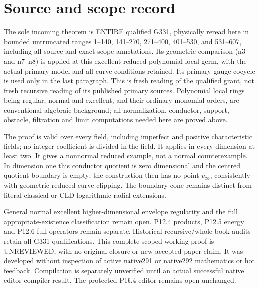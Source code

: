 \documentclass[11pt]{article}
\begin{document}
\section{Source and scope record}

The sole incoming theorem is ENTIRE qualified G331, physically reread
here in bounded untruncated ranges 1--140, 141--270, 271--400, 401--530,
and 531--607, including all source and exact-scope annotations.
Its geometric comparison (n3 and n7--n8) is applied at this excellent
reduced polynomial local germ, with the actual primary-model and all-curve
conditions retained. Its primary-gauge cocycle is used only in the last
paragraph. This is fresh reading of the qualified grant, not fresh
recursive reading of its published primary sources.
Polynomial local rings being regular, normal and excellent, and their
ordinary monomial orders, are conventional algebraic background;
all normalization, conductor, support, obstacle, filtration and limit
computations needed here are proved above.

The proof is valid over every field, including imperfect and positive
characteristic fields; no integer coefficient is divided in the field.
It applies in every dimension at least two. It gives a nonnormal reduced
example, not a normal counterexample. In dimension one this conductor
quotient is zero dimensional and the centred quotient boundary is empty;
the construction then has no point \(v_\infty\), consistently with
geometric reduced-curve clipping. The boundary cone remains distinct
from literal classical or CLD logarithmic radial extensions.

General normal excellent higher-dimensional envelope regularity and
the full appropriate-existence classification remain open.
P12.4 products, P12.5 energy and P12.6 full operators remain separate.
Historical recursive/whole-book audits retain all G331 qualifications.
This complete scoped working proof is UNREVIEWED, with no original
closure or new accepted-paper claim. It was developed without inspection
of active native291 or native292 mathematics or hot feedback.
Compilation is separately unverified until an actual successful native
editor compiler result. The protected P16.4 editor remains open unchanged.
\end{document}
